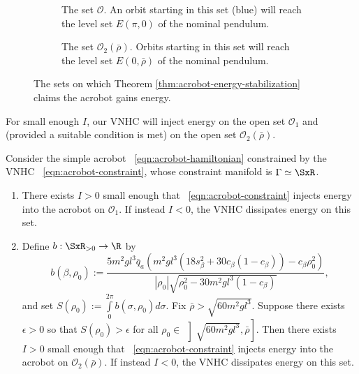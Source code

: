 \begin{figure}
    \centering
    \begin{subfigure}[t]{0.45\textwidth}
        
        \caption{The set \(\mathcal{O}\). An orbit starting in this set (blue)
            will reach the level set \(E(\pi,0)\) of the nominal pendulum.}
        \label{fig:acrobot-oscillation-domain}
    \end{subfigure}
    \hfill
    \begin{subfigure}[t]{0.45\textwidth}
        
        \caption{The set \(\mathcal{O}_2(\bar{\rho})\). Orbits starting in this set will
            reach the level set \(E(0,\bar{\rho})\) of the nominal pendulum.}
            \label{fig:acrobot-o2}
    \end{subfigure}
    \caption{The sets on which Theorem \ref{thm:acrobot-energy-stabilization}
        claims the acrobot gains energy.}
\end{figure}

For small enough \(I\), our VNHC will inject energy on the open set
\(\mathcal{O}_1\) and (provided a suitable condition is met) on the open set
\(\mathcal{O}_2(\bar{\rho})\).

\begin{thm}\label{thm:acrobot-energy-stabilization}
    Consider the simple acrobot ~\eqref{eqn:acrobot-hamiltonian} constrained by
    the VNHC ~\eqref{eqn:acrobot-constraint}, whose
    constraint manifold is \(\Gamma \simeq \SxR\).
\begin{enumerate}
    \item There exists \(I > 0\) small enough that 
    ~\eqref{eqn:acrobot-constraint} injects energy into the acrobot on
    \(\mathcal{O}_1\).
    If instead \(I < 0\), the VNHC dissipates energy on this set.
\item Define \(b : \SxR_{> 0} \rightarrow \R\) by
    \[
        b(\beta,\rho_0) := 
        \frac{5m^2 g l^3 \bar{q}_a \left(
            m^2gl^3\left(18s_\beta^2 + 30c_\beta(1 - c_\beta)\right)
            - c_\beta\rho_0^2
        \right)}{
        |\rho_0|\sqrt{\rho_0^2 - 30m^2gl^3(1 - c_\beta)}
        }
        ,
    \]
    and set \(S(\rho_0) := \int \limits_{0}^{2\pi} b(\sigma,\rho_0)d\sigma\).
    Fix \(\bar{\rho} > \sqrt{60m^2gl^3}\).
    Suppose there exists \(\epsilon > 0\) so that \(S(\rho_0) > \epsilon\) for
    all \(\rho_0 \in \, \left]\sqrt{60m^2gl^3}, \bar{\rho}\right]\).
    Then there exists \(I > 0\) small enough that
    ~\eqref{eqn:acrobot-constraint} injects energy into the acrobot on
    \(\mathcal{O}_2(\bar{\rho})\).
    If instead \(I < 0\), the VNHC dissipates energy on this set.
\end{enumerate}
\end{thm}

